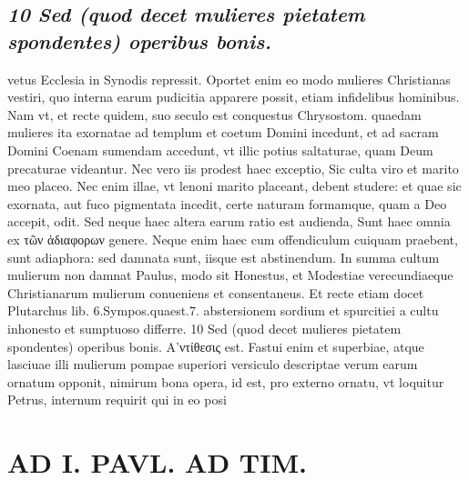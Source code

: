 \documentclass{article}
\begin{document}
\begin{pages}
\subsection*{\textit{10 Sed (quod decet mulieres pietatem spondentes) operibus bonis.}}vetus Ecclesia in Synodis repressit. Oportet enim eo modo mulieres Christianas vestiri, quo interna earum pudicitia apparere possit, etiam infidelibus hominibus. Nam vt, et recte quidem, suo seculo est conquestus Chrysostom. quaedam mulieres ita exornatae ad templum et coetum Domini incedunt, et ad sacram Domini Coenam sumendam accedunt, vt illic potius saltaturae, quam Deum precaturae videantur. Nec vero iis prodest haec exceptio, Sic culta viro et marito meo placeo. Nec enim illae, vt lenoni marito placeant, debent studere: et quae sic exornata, aut fuco pigmentata incedit, certe naturam formamque, quam a Deo accepit, odit. Sed neque haec altera earum ratio est audienda, Sunt haec omnia ex τῶν ἀδιαφορων genere. Neque enim haec cum offendiculum cuiquam praebent, sunt adiaphora: sed damnata sunt, iisque est abstinendum. In summa cultum mulierum non damnat Paulus, modo sit Honestus, et Modestiae verecundiaeque Christianarum mulierum conueniens et consentaneus. Et recte etiam docet Plutarchus lib. 6.Sympos.quaest.7. abstersionem sordium et spurcitiei a cultu inhonesto et sumptuoso differre. 10 Sed (quod decet mulieres pietatem spondentes) operibus bonis. A'ντίθεσις est. Fastui enim et superbiae, atque lasciuae illi mulierum pompae superiori versiculo descriptae verum earum ornatum opponit, nimirum bona opera, id est, pro externo ornatu, vt loquitur Petrus, internum requirit qui in eo posi\pend
\section*{AD I. PAVL. AD TIM. }
\marginpar{[ p.82 ]}\pstart {}
{}

\end{pages}
\end{document}
